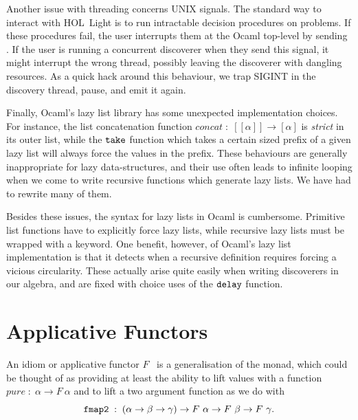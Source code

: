 
Another issue with threading concerns UNIX signals. The standard way to interact with HOL~Light is to run intractable decision procedures on problems. If these procedures fail, the user interrupts them at the Ocaml top-level by sending . If the user is running a concurrent discoverer when they send this signal, it might interrupt the wrong thread, possibly leaving the discoverer with dangling resources. As a quick hack around this behaviour, we trap SIGINT in the discovery thread, pause, and emit it again.

Finally, Ocaml's lazy list library has some unexpected implementation choices. For instance, the list concatenation function $concat\;:\;[[\alpha]]\rightarrow[\alpha]$ is \emph{strict} in its outer list, while the $\texttt{take}$ function which takes a certain sized prefix of a given lazy list will always force the values in the prefix. These behaviours are generally inappropriate for lazy data-structures, and their use often leads to infinite looping when we come to write recursive functions which generate lazy lists. We have had to rewrite many of them.

Besides these issues, the syntax for lazy lists in Ocaml is cumbersome. Primitive list functions have to explicitly force lazy lists, while recursive lazy lists must be wrapped with a  keyword. One benefit, however, of Ocaml's lazy list implementation is that it detects when a recursive definition requires forcing a vicious circularity. These actually arise quite easily when writing discoverers in our algebra, and are fixed with choice uses of the $\texttt{delay}$ function.

\section{Applicative Functors}\label{sec:Applicative}
An idiom or applicative functor $F$~\cite{Applicative} is a generalisation of the monad, which could be thought of as providing at least the ability to lift values with a function $pure\;:\;\alpha \rightarrow F\ \alpha$ and to lift a two argument function as we do with 
\begin{displaymath}
\texttt{fmap2}\;:\;(\alpha\rightarrow\beta\rightarrow\gamma)\rightarrow F\ \alpha \rightarrow F\ \beta \rightarrow F\ \gamma.
\end{displaymath}


